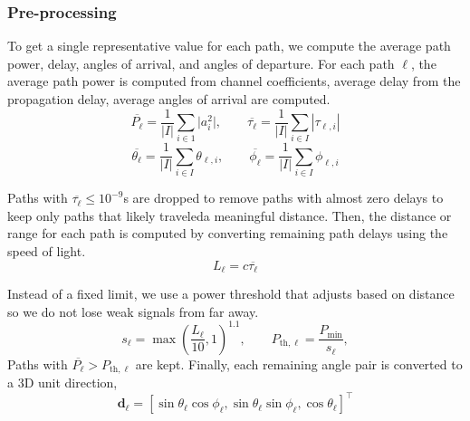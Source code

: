 \subsubsection{Pre-processing}
\label{subsubsec:preprocessing}

To get a single representative value for each path, we compute the average path power, delay, angles of arrival, and angles of departure.
For each path $\ell$, the average path power is computed from channel coefficients, average delay from the propagation delay, average angles of arrival are computed.
\begin{equation}
    \overline{P_\ell} = \frac{1}{|I|}\sum_{i\in1}{|a_{i}^{2}}|,
    \qquad
    \overline{\tau_\ell} = \frac{1}{|I|}\sum_{i\in I}{|\tau_{\ell,i}|}
\end{equation}
\begin{equation}
    \overline{\theta_\ell} = \frac{1}{|I|}\sum_{i\in I}{\theta_{\ell,i}},
    \qquad
    \overline{\phi_\ell} = \frac{1}{|I|}\sum_{i\in I}{\phi_{\ell,i}}
\end{equation}

Paths with $\overline{\tau_\ell} \le 10^{-9}$s are dropped to remove paths with almost zero delays to keep only paths that likely traveleda meaningful distance.
Then, the distance or range for each path is computed by converting remaining path delays using the speed of light.
\begin{equation}
    L_\ell = c\overline{\tau_\ell}
\end{equation}

Instead of a fixed limit, we use a power threshold that adjusts based on distance so we do not lose weak signals from far away.
\begin{equation}
    s_\ell = \max\!\left(\frac{L_\ell}{10},1\right)^{\!1.1},
    \qquad
    P_{\mathrm{th},\ell} = \frac{P_{\min}}{s_\ell},
\end{equation}
Paths with $\overline{P_\ell}>P_{\mathrm{th},\ell}$ are kept.
Finally, each remaining angle pair is converted to a 3D unit direction,
\begin{equation}
    \mathbf{d}_\ell=[\sin\theta_\ell\cos\phi_\ell,\sin\theta_\ell\sin\phi_\ell,\cos\theta_\ell]^{\!\top}
\end{equation}